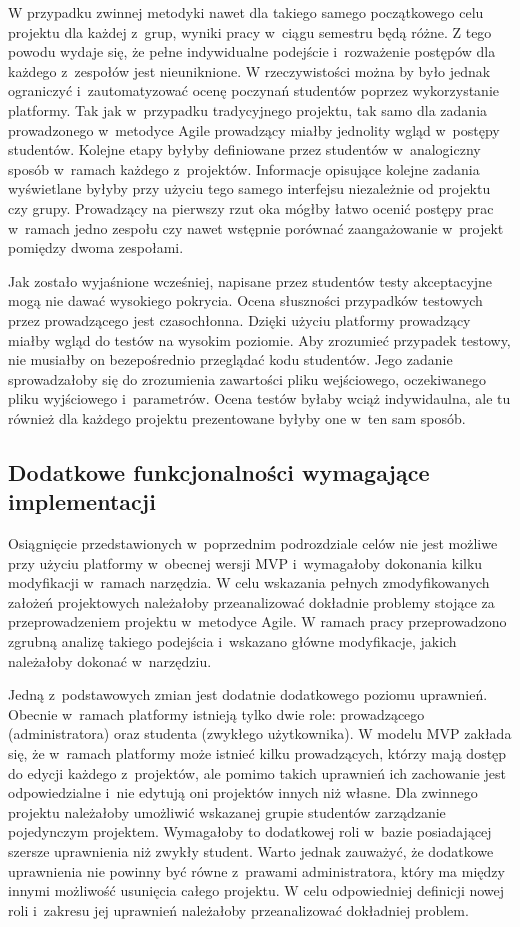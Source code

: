W przypadku zwinnej metodyki nawet dla takiego samego początkowego celu projektu dla każdej z~grup, wyniki pracy w~ciągu semestru będą różne.
Z tego powodu wydaje się, że pełne indywidualne podejście i~rozważenie postępów dla każdego z~zespołów jest nieuniknione.
W rzeczywistości można by było jednak ograniczyć i~zautomatyzować ocenę poczynań studentów poprzez wykorzystanie platformy.
Tak jak w~przypadku tradycyjnego projektu, tak samo dla zadania prowadzonego w~metodyce Agile prowadzący miałby jednolity wgląd w~postępy studentów.
Kolejne etapy byłyby definiowane przez studentów w~analogiczny sposób w~ramach każdego z~projektów.
Informacje opisujące kolejne zadania wyświetlane byłyby przy użyciu tego samego interfejsu niezależnie od projektu czy grupy.
Prowadzący na pierwszy rzut oka mógłby łatwo ocenić postępy prac w~ramach jedno zespołu czy nawet wstępnie porównać zaangażowanie w~projekt pomiędzy dwoma zespołami.

Jak zostało wyjaśnione wcześniej, napisane przez studentów testy akceptacyjne mogą nie dawać wysokiego pokrycia.
Ocena słuszności przypadków testowych przez prowadzącego jest czasochłonna.
Dzięki użyciu platformy prowadzący miałby wgląd do testów na wysokim poziomie.
Aby zrozumieć przypadek testowy, nie musiałby on bezepośrednio przeglądać kodu studentów.
Jego zadanie sprowadzałoby się do zrozumienia zawartości pliku wejściowego, oczekiwanego pliku wyjściowego i~parametrów.
Ocena testów byłaby wciąż indywidaulna, ale tu również dla każdego projektu prezentowane byłyby one w~ten sam sposób.

\subsection{Dodatkowe funkcjonalności wymagające implementacji}
\label{agile_todo}

Osiągnięcie przedstawionych w~poprzednim podrozdziale celów nie jest możliwe przy użyciu platformy w~obecnej wersji MVP i~wymagałoby dokonania kilku modyfikacji w~ramach narzędzia.
W celu wskazania pełnych zmodyfikowanych założeń projektowych należałoby przeanalizować dokładnie problemy stojące za przeprowadzeniem projektu w~metodyce Agile.
W ramach pracy przeprowadzono zgrubną analizę takiego podejścia i~wskazano główne modyfikacje, jakich należałoby dokonać w~narzędziu.

Jedną z~podstawowych zmian jest dodatnie dodatkowego poziomu uprawnień.
Obecnie w~ramach platformy istnieją tylko dwie role: prowadzącego (administratora) oraz studenta (zwykłego użytkownika).
W modelu MVP zakłada się, że w~ramach platformy może istnieć kilku prowadzących, którzy mają dostęp do edycji każdego z~projektów, ale pomimo takich uprawnień ich zachowanie jest odpowiedzialne i~nie edytują oni projektów innych niż własne.
Dla zwinnego projektu należałoby umożliwić wskazanej grupie studentów zarządzanie pojedynczym projektem.
Wymagałoby to dodatkowej roli w~bazie posiadającej szersze uprawnienia niż zwykły student.
Warto jednak zauważyć, że dodatkowe uprawnienia nie powinny być równe z~prawami administratora, który ma między innymi możliwość usunięcia całego projektu.
W celu odpowiedniej definicji nowej roli i~zakresu jej uprawnień należałoby przeanalizować dokładniej problem.

